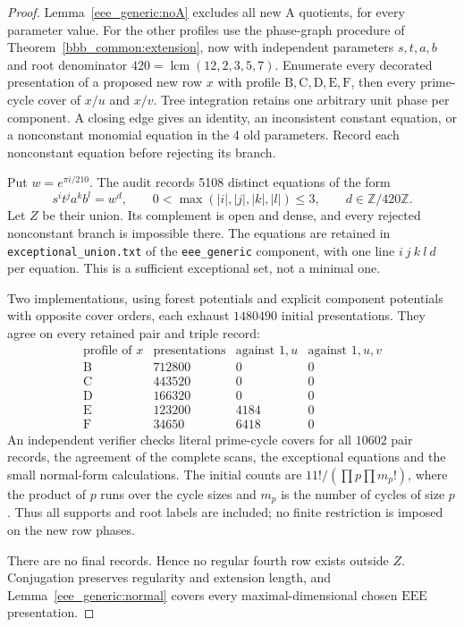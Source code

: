 \documentclass[11pt,a4paper]{article}
\theoremstyle{plain}
\theoremstyle{definition}
\theoremstyle{plain}
\begin{document}
\begin{proof}
Lemma~\ref{eee_generic:noA} excludes all new $\mathrm{A}$ quotients, for every parameter value. For the other profiles use the phase-graph procedure of Theorem~\ref{bbb_common:extension}, now with independent parameters $s,t,a,b$ and root denominator $420=\operatorname{lcm}(12,2,3,5,7)$. Enumerate every decorated presentation of a proposed new row $x$ with profile $\mathrm{B},\mathrm{C},\mathrm{D},\mathrm{E},\mathrm{F}$, then every prime-cycle cover of $x/u$ and $x/v$. Tree integration retains one arbitrary unit phase per component. A closing edge gives an identity, an inconsistent constant equation, or a nonconstant monomial equation in the 4 old parameters. Record each nonconstant equation before rejecting its branch.

Put $w=e^{\pi i/210}$. The audit records 5108 distinct equations of the form
$$s^it^ja^kb^l=w^d,\qquad
0<\max(|i|,|j|,|k|,|l|)\le3,\qquad d\in\mathbb Z/420\mathbb Z.$$
Let $Z$ be their union. Its complement is open and dense, and every rejected nonconstant branch is impossible there. The equations are retained in \texttt{exceptional\_union.txt} of the \texttt{eee\_generic} component, with one line $i\ j\ k\ l\ d$ per equation. This is a sufficient exceptional set, not a minimal one.

Two implementations, using forest potentials and explicit component potentials with opposite cover orders, each exhaust $1480490$ initial presentations. They agree on every retained pair and triple record:
$$\begin{array}{c|r|r|r}
\text{profile of }x&\text{presentations}&\text{against }1,u&\text{against }1,u,v\\\hline
\mathrm{B}&712800&0&0\\
\mathrm{C}&443520&0&0\\
\mathrm{D}&166320&0&0\\
\mathrm{E}&123200&4184&0\\
\mathrm{F}&34650&6418&0
\end{array}$$
An independent verifier checks literal prime-cycle covers for all $10602$ pair records, the agreement of the complete scans, the exceptional equations and the small normal-form calculations. The initial counts are $11!/(\prod p\prod m_p!)$, where the product of $p$ runs over the cycle sizes and $m_p$ is the number of cycles of size $p$. Thus all supports and root labels are included; no finite restriction is imposed on the new row phases.

There are no final records. Hence no regular fourth row exists outside $Z$. Conjugation preserves regularity and extension length, and Lemma~\ref{eee_generic:normal} covers every maximal-dimensional chosen $\mathrm{EEE}$ presentation.
\end{proof}
\end{document}

